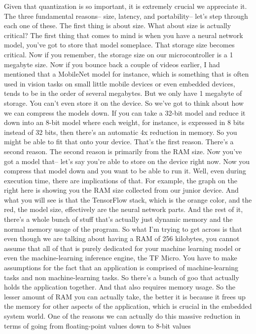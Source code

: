 Given that quantization is so important, it
is extremely crucial we appreciate it.
The three fundamental reasons-- size, latency, and portability--
let's step through each one of these.
The first thing is about size.
What about size is actually critical?
The first thing that comes to mind is when you have a neural network model,
you've got to store that model someplace.
That storage size becomes critical.
Now if you remember, the storage size on our microcontroller
is a 1 megabyte size.
Now if you bounce back a couple of videos earlier,
I had mentioned that a MobileNet model for instance, which
is something that is often used in vision tasks
on small little mobile devices or even embedded devices,
tends to be in the order of several megabytes.
But we only have 1 megabyte of storage.
You can't even store it on the device.
So we've got to think about how we can compress the models down.
If you can take a 32-bit model and reduce it down into an 8-bit model
where each weight, for instance, is expressed in 8 bits instead of 32 bits,
then there's an automatic 4x reduction in memory.
So you might be able to fit that onto your device.
That's the first reason.
There's a second reason.
The second reason is primarily from the RAM size.
Now you've got a model that-- let's say you're able to store on the device
right now.
Now you compress that model down and you want to be able to run it.
Well, even during execution time, there are implications of that.
For example, the graph on the right here is showing you the RAM size
collected from our junior device.
And what you will see is that the TensorFlow stack, which
is the orange color, and the red, the model size,
effectively are the neural network parts.
And the rest of it, there's a whole bunch of stuff
that's actually just dynamic memory and the normal memory usage of the program.
So what I'm trying to get across is that even though we are talking about having
a RAM of 256 kilobytes, you cannot assume that all of that is purely
dedicated for your machine learning model or even the machine-learning
inference engine, the TF Micro.
You have to make assumptions for the fact
that an application is comprised of machine-learning tasks
and non machine-learning tasks.
So there's a bunch of goo that actually holds the application together.
And that also requires memory usage.
So the lesser amount of RAM you can actually take,
the better it is because it frees up the memory
for other aspects of the application, which is crucial in the embedded system
world.
One of the reasons we can actually do this massive reduction in terms
of going from floating-point values down to 8-bit values
